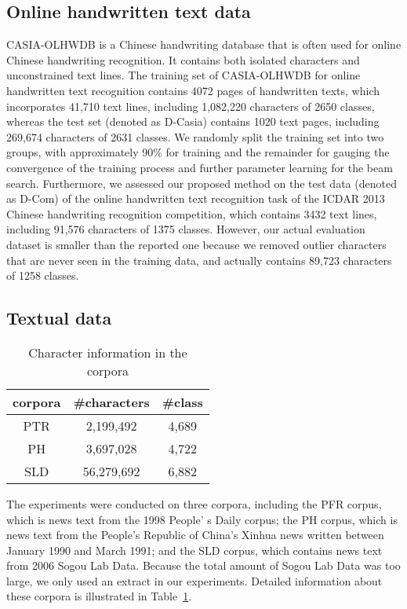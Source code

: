 \documentclass[10pt,conference,a4paper]{IEEEtran}
\begin{document}
\subsection{Online handwritten text data}
CASIA-OLHWDB\cite{liu2011casia} is a Chinese handwriting database that is often used for online Chinese handwriting recognition.
It contains both isolated characters and unconstrained text lines.
The training set of CASIA-OLHWDB for online handwritten text recognition contains 4072 pages of handwritten texts, which incorporates 41,710 text lines, including 1,082,220 characters of 2650 classes,
whereas the test set (denoted as D-Casia) contains 1020 text pages, including 269,674 characters of 2631 classes.
We randomly split the training set into two groups, with approximately 90\% for training and the remainder for gauging the convergence of the training process and further parameter learning for the beam search.
Furthermore, we assessed our proposed method on the test data (denoted as D-Com) of the online handwritten text recognition task of the ICDAR 2013 Chinese handwriting recognition competition\cite{liuicdar}, which contains 3432 text lines, including 91,576 characters of 1375 classes.
However, our actual evaluation dataset is smaller than the reported one because we removed outlier characters that are never seen in the training data, and actually contains 89,723 characters of 1258 classes.
%


\subsection{Textual data}
\begin{table}[b]
\caption{Character information in the corpora}
\label{TableCorpora}
\centering
\begin{tabular}{c|cc}
\hline
corpora&\#characters&\#class\\
\hline
PTR&2,199,492 &4,689\\
PH&3,697,028&4,722\\
SLD&56,279,692&6,882\\
\hline
\end{tabular}
\end{table}
The experiments were conducted on three corpora,
including the PFR corpus\cite{PFR}, which is news text from the 1998 People' s Daily corpus;
the PH\cite{PH} corpus, which is news text from the People's Republic of China's Xinhua news written between January 1990 and March 1991;
and the SLD corpus\cite{SG}, which contains news text from 2006 Sogou Lab Data.
Because the total amount of Sogou Lab Data was too large, we only used an extract in our experiments.
Detailed information about these corpora is illustrated in Table~\ref{TableCorpora}.
\end{document}
